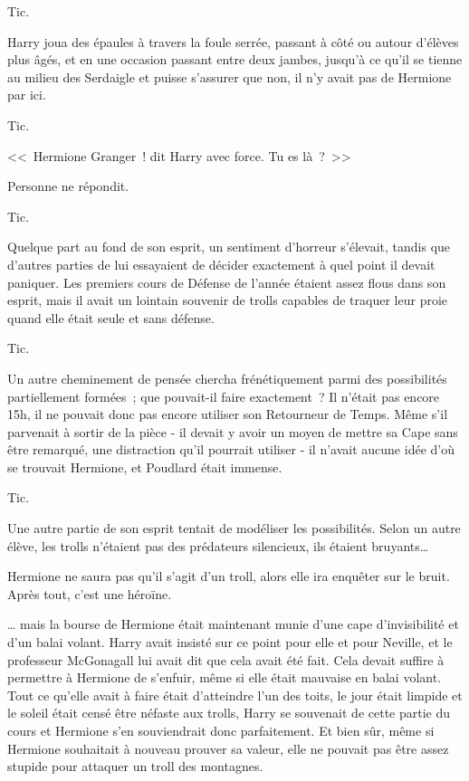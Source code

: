 Tic.

Harry joua des épaules à travers la foule serrée, passant à côté ou autour d'élèves plus âgés, et en une occasion passant entre deux jambes, jusqu'à ce qu'il se tienne au milieu des Serdaigle et puisse s'assurer que non, il n'y avait pas de Hermione par ici.

Tic.

<<~Hermione Granger~! dit Harry avec force. Tu es là~?~>>

Personne ne répondit.

Tic.

Quelque part au fond de son esprit, un sentiment d'horreur s'élevait, tandis que d'autres parties de lui essayaient de décider exactement à quel point il devait paniquer. Les premiers cours de Défense de l'année étaient assez flous dans son esprit, mais il avait un lointain souvenir de trolls capables de traquer leur proie quand elle était seule et sans défense.

Tic.

Un autre cheminement de pensée chercha frénétiquement parmi des possibilités partiellement formées~; que pouvait-il faire exactement~? Il n'était pas encore 15h, il ne pouvait donc pas encore utiliser son Retourneur de Temps. Même s'il parvenait à sortir de la pièce - il devait y avoir un moyen de mettre sa Cape sans être remarqué, une distraction qu'il pourrait utiliser - il n'avait aucune idée d'où se trouvait Hermione, et Poudlard était immense.

Tic.

Une autre partie de son esprit tentait de modéliser les possibilités. Selon un autre élève, les trolls n'étaient pas des prédateurs silencieux, ils étaient bruyants…

Hermione ne saura pas qu'il s'agit d'un troll, alors elle ira enquêter sur le bruit. Après tout, c'est une héroïne.

… mais la bourse de Hermione était maintenant munie d'une cape d'invisibilité et d'un balai volant. Harry avait insisté sur ce point pour elle et pour Neville, et le professeur McGonagall lui avait dit que cela avait été fait. Cela devait suffire à permettre à Hermione de s'enfuir, même si elle était mauvaise en balai volant. Tout ce qu'elle avait à faire était d'atteindre l'un des toits, le jour était limpide et le soleil était censé être néfaste aux trolls, Harry se souvenait de cette partie du cours et Hermione s'en souviendrait donc parfaitement. Et bien sûr, même si Hermione souhaitait à nouveau prouver sa valeur, elle ne pouvait pas être assez stupide pour attaquer un troll des montagnes.

